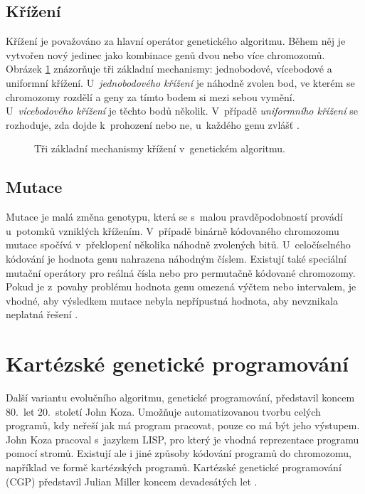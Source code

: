 \subsection{Křížení}

Křížení je považováno za hlavní operátor genetického algoritmu. Během něj je vytvořen nový jedinec jako kombinace genů dvou nebo více chromozomů. Obrázek \ref{obrKrizeni} znázorňuje tři základní mechanismy: jednobodové, vícebodové a uniformní křížení. U~\emph{jednobodového křížení} je náhodně zvolen bod, ve kterém se chromozomy rozdělí a geny za tímto bodem si mezi sebou vymění. U~\emph{vícebodového křížení} je těchto bodů několik. V~případě \emph{uniformního křížení} se rozhoduje, zda dojde k~prohození nebo ne, u~každého genu zvlášť \cite{Modra}.

\begin{figure}[htb]
    \centering
    \hskip1cm
    \hskip1cm
    \caption{Tři základní mechanismy křížení v~genetickém algoritmu.}
    \label{obrKrizeni}
\end{figure}


\subsection{Mutace}

Mutace je malá změna genotypu, která se s~malou pravděpodobností provádí u~potomků vzniklých křížením. V~případě binárně kódovaného chromozomu mutace spočívá v~překlopení několika náhodně zvolených bitů. U~celočíselného kódování je hodnota genu nahrazena náhodným číslem. Existují také speciální mutační operátory pro reálná čísla nebo pro permutačně kódované chromozomy. Pokud je z~povahy problému hodnota genu omezená výčtem nebo intervalem, je vhodné, aby výsledkem mutace nebyla nepřípustná hodnota, aby nevznikala neplatná řešení \cite{Modra}.

\section{Kartézské genetické programování}
\label{secCGP}

Další variantu evolučního algoritmu, genetické programování, představil koncem 80.~let 20.~století John Koza. Umožňuje automatizovanou tvorbu celých programů, kdy neřeší jak má program pracovat, pouze co má být jeho výstupem. John Koza pracoval s~jazykem LISP, pro který je vhodná reprezentace programu pomocí stromů. Existují ale i jiné způsoby kódování programů do chromozomu, například ve formě kartézských programů. Kartézské genetické programování (CGP) představil Julian Miller koncem devadesátých let \cite{Miller2000}.

